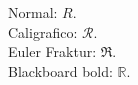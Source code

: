 
Normal: $R$. \\
Caligrafico: $\mathcal{R}$. \\
Euler Fraktur: $\mathfrak{R}$. \\
Blackboard bold: $\mathbb{R}$.

